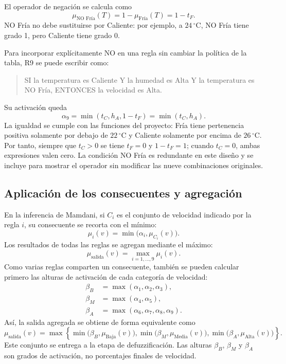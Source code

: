 \documentclass[11pt]{article}
\begin{document}
El operador de negación se calcula como
\[
\mu_{\text{NO Fría}}(T)=1-\mu_{\text{Fría}}(T)=1-t_F.
\]
NO Fría no debe sustituirse por Caliente: por ejemplo, a $24\,^\circ$C,
NO Fría tiene grado 1, pero Caliente tiene grado 0.

Para incorporar explícitamente NO en una regla sin cambiar la política
de la tabla, R9 se puede escribir como:
\begin{quote}
SI la temperatura es Caliente Y la humedad es Alta Y la temperatura es
NO Fría, ENTONCES la velocidad es Alta.
\end{quote}
Su activación queda
\[
\alpha_9=\min(t_C,h_A,1-t_F)=\min(t_C,h_A).
\]
La igualdad se cumple con las funciones del proyecto: Fría tiene pertenencia
positiva solamente por debajo de $22\,^\circ$C y Caliente solamente por
encima de $26\,^\circ$C. Por tanto, siempre que $t_C>0$ se tiene $t_F=0$
y $1-t_F=1$; cuando $t_C=0$, ambas expresiones valen cero. La condición
NO Fría es redundante en este diseño y se incluye para mostrar el operador
sin modificar las nueve combinaciones originales.

\subsection{Aplicación de los consecuentes y agregación}

En la inferencia de Mamdani, si $C_i$ es el conjunto de velocidad indicado
por la regla $i$, su consecuente se recorta con el mínimo:
\[
\mu_i(v)=\min\bigl(\alpha_i,\mu_{C_i}(v)\bigr).
\]
Los resultados de todas las reglas se agregan mediante el máximo:
\[
\mu_{\mathrm{salida}}(v)=\max_{i=1,\ldots,9}\mu_i(v).
\]
Como varias reglas comparten un consecuente, también se pueden calcular
primero las alturas de activación de cada categoría de velocidad:
\begin{align*}
\beta_B&=\max(\alpha_1,\alpha_2,\alpha_3),\\
\beta_M&=\max(\alpha_4,\alpha_5),\\
\beta_A&=\max(\alpha_6,\alpha_7,\alpha_8,\alpha_9).
\end{align*}
Así, la salida agregada se obtiene de forma equivalente como
\[
\mu_{\mathrm{salida}}(v)=\max\left\{
\min\bigl(\beta_B,\mu_{\text{Baja}}(v)\bigr),
\min\bigl(\beta_M,\mu_{\text{Media}}(v)\bigr),
\min\bigl(\beta_A,\mu_{\text{Alta}}(v)\bigr)
\right\}.
\]
Este conjunto se entrega a la etapa de defuzzificación. Las alturas
$\beta_B$, $\beta_M$ y $\beta_A$ son grados de activación, no porcentajes
finales de velocidad.
\end{document}
